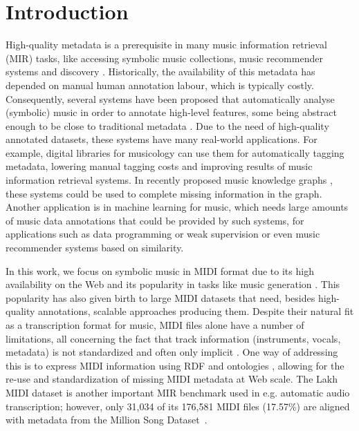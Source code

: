 \documentclass{article}
\begin{document}
\section{Introduction}
\label{sec:introduction}
High-quality metadata is a prerequisite in many music information retrieval (MIR) tasks, like accessing symbolic music collections, music recommender systems and discovery \citep{casey2008content}. Historically, the availability of this metadata has depended on manual human annotation labour, which is typically costly. Consequently, several systems have been proposed that automatically analyse (symbolic) music in order to 
annotate
high-level features, some being abstract enough to be close to traditional metadata \citep{bogdanov2013essentia}. 
Due to the need of high-quality annotated datasets, these systems have many real-world applications. For example, digital libraries for musicology can use them for automatically tagging metadata, lowering manual tagging costs and improving results of music information retrieval systems. In recently proposed music knowledge graphs \cite{merono2017midi}, these systems could be used to complete missing information in the graph. Another application is in machine learning for music, which needs large amounts of music data annotations that could be provided by such systems, for applications such as data programming \cite{ratner2017data} or weak supervision \cite{ratner2017snorkel} or even music recommender systems based on similarity.

In this work, we focus on symbolic music in MIDI format \citep{midispec} due to its high availability on the Web and its popularity in tasks like music generation \citep{roberts2018}.
This popularity has also given birth to large MIDI datasets that need, besides high-quality annotations, scalable approaches producing them.
Despite their natural fit as a transcription format for music, MIDI files alone have a number of limitations, all concerning the fact that track information (instruments, vocals, metadata) is not standardized and often only implicit \citep{raffel2016}. One way of addressing this is to express MIDI information using RDF and ontologies \citep{merono2017midi}, allowing for the re-use and standardization of missing MIDI metadata at Web scale. The Lakh MIDI dataset \citep{raffel2016} is another important MIR benchmark used in e.g. automatic audio transcription; however, only 31,034 of its 176,581 MIDI files (17.57\%) are aligned with metadata from the Million Song Dataset~\citep{raffel2016thesis}.
\end{document}
